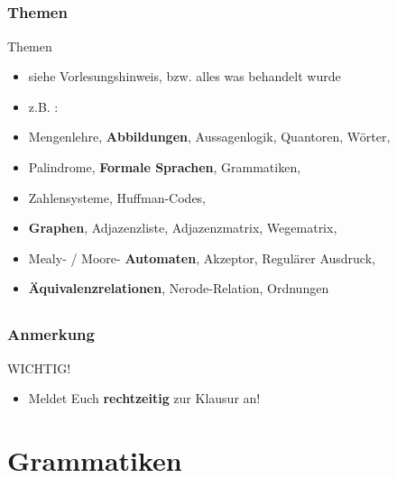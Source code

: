 \subsection*{}
\begin{frame}
  \frametitle{Themen}
	\begin{block}{Themen}

		\begin{itemize}
		\item siehe Vorlesungshinweis, bzw. alles was behandelt wurde
	  	\item z.B. :\pause
		  	\item Mengenlehre, \textbf{Abbildungen}, Aussagenlogik, Quantoren, Wörter,
		  	\item Palindrome, \textbf{Formale Sprachen}, Grammatiken,
		  	\item Zahlensysteme, Huffman-Codes,
		  	\item \textbf{Graphen}, Adjazenzliste, Adjazenzmatrix, Wegematrix,
		  	\item Mealy- / Moore- \textbf{Automaten}, Akzeptor, Regulärer Ausdruck,
		  	\item \textbf{Äquivalenzrelationen}, Nerode-Relation, Ordnungen
	 	\end{itemize}
	\end{block}
\end{frame}

\subsection*{}
\begin{frame}
   \frametitle{Anmerkung}
	\begin{block}{WICHTIG!}
  	\begin{itemize}
			\item Meldet Euch \textbf{rechtzeitig} zur Klausur an!
		\end{itemize}
	\end{block}

\end{frame}

\section{Grammatiken}
